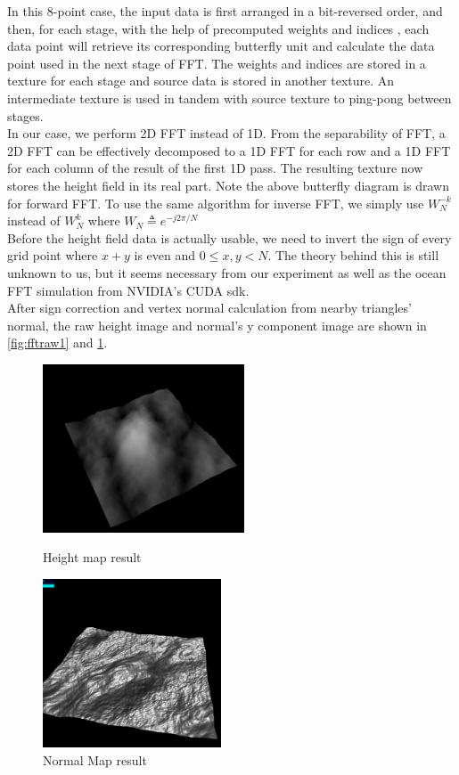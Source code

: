 \documentclass{jcgt}
\begin{document}
In this 8-point case, the input data is first arranged in a bit-reversed order, and then, for each stage, with the help of precomputed weights and indices , each data point will retrieve its corresponding butterfly unit and calculate the data point used in the next stage of FFT. The weights and indices are stored in a texture for each stage and source data is stored in another texture. An intermediate texture is used in tandem with source texture to ping-pong between stages. \\

In our case, we perform 2D FFT instead of 1D. From the separability of FFT, a 2D FFT can be effectively decomposed to a 1D FFT for each row and a 1D FFT for each column of the result of the first 1D pass. The resulting texture now stores the height field in its real part. Note the above butterfly diagram is drawn for forward FFT. To use the same algorithm for inverse FFT, we simply use $W_N ^{-k}$ instead of $W_N ^k$ where $W_N \triangleq e^{-j2\pi / N}$\\

Before the height field data is actually usable, we need to invert the sign of every grid point where $x+y$ is even and $0 \leq x, y < N$. The theory behind this is still unknown to us, but it seems necessary from our experiment as well as the ocean FFT simulation from NVIDIA's CUDA sdk.\\

After sign correction and vertex normal calculation from nearby triangles' normal, the raw height image and normal's y component image are shown in \ref{fig:fftraw1} and \ref{fig:fftraw2}.
\begin{figure}[htb]
\begin{minipage}{0.49\textwidth}
\centering
   \includegraphics[height=5cm]{fft_raw1.png}
   \caption{\label{fig:fftraw1}
      Height map result}
\end{minipage}\hfill
\begin{minipage}{0.49\textwidth}
\centering
   \includegraphics[height=5cm]{fft_raw2.png}
   \caption{\label{fig:fftraw2}
      Normal Map result}
\end{minipage}\hfill
\end{figure}
\end{document}
